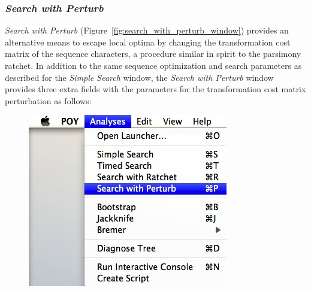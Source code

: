 {\subsubsection*{\emph{Search with Perturb}}

\emph{Search with Perturb} (Figure~\ref{fig:search_with_perturb_window}) provides an alternative means to escape local 
optima by changing the transformation cost matrix of the sequence characters, a procedure similar in spirit to the parsimony 
ratchet. In addition to the same sequence optimization and search parameters as described for the \emph{Simple Search} 
window, the \emph{Search with Perturb} window provides three extra fields with the parameters for the
transformation cost matrix perturbation as follows:

\begin{figure}
\centering
\begin{minipage}[c]{0.45\textwidth}
   		\includegraphics[width=\textwidth]{doc/figures/searchwithperturb_menu.jpg}
\end{minipage}
\,
\begin{minipage}[c]{0.52\textwidth}

\end{minipage}
\end{figure}}
